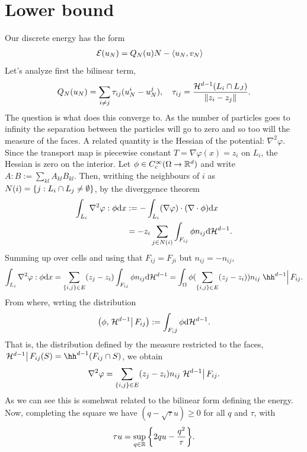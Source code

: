 \documentclass[
    a4paper,
    DIV=13,
    abstract=true,
    numbers=noenddot
]{scrartcl}
\begin{document}
\section{Lower bound}
Our discrete energy has the form 
\begin{align*}
  \Ee(u_N)&= Q_N(u)N- \br{ u_N,v_N } 
\end{align*}
Let's analyze first the bilinear term,
\begin{align*}
  Q_N(u_N)= \sum_{i \neq j} \tau_{ij}(u_N^i-u_N^j), \quad \tau_{ij}= \frac{\Hh^{d-1}(L_i \cap L_J)}{\norm{z_i-z_j}}. 
\end{align*}
The question is what does this converge to. As the number of particles goes to infinity the separation between the particles will go to zero and so too will the measure of the faces. A related quantity is the Hessian of the potential: $\nabla^2 \varphi$. Since the transport map is piecewise constant $T= \nabla \varphi(x)= z_i$ on $L_i$, the Hessian is zero on the interior. Let $\phi \in  C_c^\infty(\Omega \to \R^d)$ and write $A:B:= \sum_{k l}A_{k l} B_{k l} $. Then, writhing the neighbours of $i$ as $N(i)= \set{j: L_i \cap L_j \neq  \emptyset}$, by the diverggence theorem
\begin{align*}
  \int_{L_i} \nabla^2 \varphi :\phi \d x&:= -\int_{L_i} (\nabla \varphi) \cdot (\nabla \cdot \phi) \d x \\
                                        &=-z_i \sum_{j \in N(i)} \int_{F_{ij}} \phi  n_{ij} \d \Hh^{d-1}.
\end{align*}
Summing up over cells and using that $F_{ij}=F_{ji}$ but $n_{ij}=- n_{ij}$,
\begin{align*}
  \int_{L_i} \nabla^2 \varphi :\phi \d x= \sum_{\set{i,j}\in E}(z_j-z_i) \int_{F_{ij}} \phi  n_{ij} \d \Hh^{d-1}= \int_{\Omega}\phi(\sum_{\set{i,j}\in E}(z_j-z_i))n_{ij}\restr{\hh^{d-1}}{F_{ij}}. 
\end{align*}
From where, wrting the distribution 
\begin{align*}
  \qty(\phi,\restr{\Hh^{d-1}}{F_{ij}}):=\int_{F_ij} \phi \d \Hh^{d-1}. 
\end{align*}
That is, the distribution defined by the measure restricted to the faces, $\restr{\Hh^{d-1}}{F_{ij}}(S)=\hh^{d-1}(F_{ij}\cap S)$, we obtain
\begin{align*}
    \nabla^2 \varphi =\sum_{\set{i,j}\in E}(z_j-z_i)n_{ij}\restr{\Hh^{d-1}}{F_{ij}}. 
\end{align*}
As we can see this is somehwat related to the bilinear form defining the energy. Now, completing the square we have $(q- \sqrt{\tau}u) \ge 0$ for all $q$ and $\tau$, with
\begin{align*}
  \tau u = \sups[q \in \R]{2qu - \frac{q^2}{\tau}}.
\end{align*}
\end{document}
